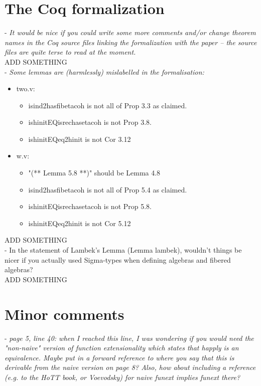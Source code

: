 \documentclass[11pt, oneside]{article}   	%
\begin{document}
\section{The Coq formalization}

- \emph{It would be nice if you could write some more comments and/or change theorem names in the Coq source files linking the formalization with the paper -- the source files are quite terse to read at the moment.} \\ 

ADD SOMETHING \\ 



-  \emph{Some lemmas are (harmlessly) mislabelled in the formalisation:}

\begin{itemize}
\item  two.v:
 \begin{itemize}
 \item isind2hasfibetacoh is not all of Prop 3.3 as claimed.
 \item ishinitEQisrechasetacoh is not Prop 3.8.
 \item ishinitEQeq2hinit is not Cor 3.12
\end{itemize}
\item  w.v:
\begin{itemize}
 \item "(** Lemma 5.8 **)" should be Lemma 4.8
 \item isind2hasfibetacoh is not all of Prop 5.4 as claimed.
 \item ishinitEQisrechasetacoh is not Prop 5.8.
 \item ishinitEQeq2hinit is not Cor 5.12 \\ 
\end{itemize}
\end{itemize}

ADD SOMETHING \\ 


- In the statement of Lambek's Lemma (Lemma lambek), wouldn't things be nicer if you actually used Sigma-types when defining algebras and fibered algebras? \\

ADD SOMETHING 

\section{Minor comments}


- \emph{page 5, line 40: when I reached this line, I was wondering if you would need the "non-naive" version of function extensionality which states that happly is an equivalence. Maybe put in a forward reference to where you say that this is derivable from the naive version on page 8? Also, how about including a reference (e.g. to
 the HoTT book, or Voevodsky) for naive funext implies funext there?} \\
\end{document}
